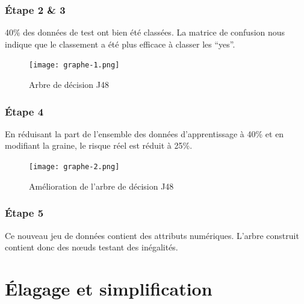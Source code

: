 \documentclass[a4paper,12pt]{article}
\begin{document}
\subsubsection*{\'Etape 2 & 3}
40\% des données de test ont bien été classées.
La matrice de confusion nous indique que le classement a été plus efficace à classer les \enquote{yes}.
\begin{figure}
	\center
	\texttt{[image: graphe-1.png]}
	\caption{Arbre de décision J48}
	\label{fig:graphe-1}
\end{figure}

\subsubsection*{\'Etape 4}
En réduisant la part de l’ensemble des données d’apprentissage à 40\% et en modifiant la graine, le risque réel est réduit à 25\%.
\begin{figure}
	\center
	\texttt{[image: graphe-2.png]}
	\caption{Amélioration de l'arbre de décision J48}
	\label{fig:graphe-2}
\end{figure}

\subsubsection*{\'Etape 5}
Ce nouveau jeu de données contient des attributs numériques.
L’arbre construit contient donc des nœuds testant des inégalités.

\section{\'Elagage et simplification}
\end{document}
